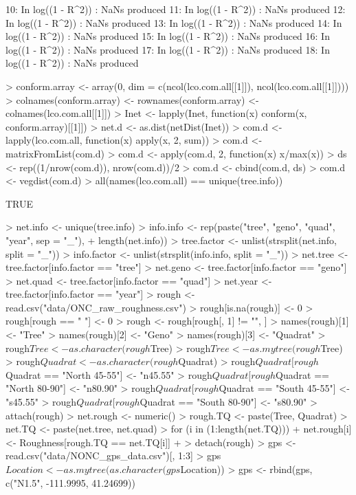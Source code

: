 \documentclass[12pt]{article}
\begin{document}
\begin{Schunk}
\begin{Soutput}
10: In log((1 - R^2)) : NaNs produced
11: In log((1 - R^2)) : NaNs produced
12: In log((1 - R^2)) : NaNs produced
13: In log((1 - R^2)) : NaNs produced
14: In log((1 - R^2)) : NaNs produced
15: In log((1 - R^2)) : NaNs produced
16: In log((1 - R^2)) : NaNs produced
17: In log((1 - R^2)) : NaNs produced
18: In log((1 - R^2)) : NaNs produced
\end{Soutput}
\begin{Sinput}
> conform.array <- array(0, dim = c(ncol(lco.com.all[[1]]), ncol(lco.com.all[[1]])))
> colnames(conform.array) <- rownames(conform.array) <- colnames(lco.com.all[[1]])
> Inet <- lapply(Inet, function(x) conform(x, conform.array)[[1]])
> net.d <- as.dist(netDist(Inet))
> com.d <- lapply(lco.com.all, function(x) apply(x, 2, sum))
> com.d <- matrixFromList(com.d)
> com.d <- apply(com.d, 2, function(x) x/max(x))
> ds <- rep((1/nrow(com.d)), nrow(com.d))/2
> com.d <- cbind(com.d, ds)
> com.d <- vegdist(com.d)
> all(names(lco.com.all) == unique(tree.info))
\end{Sinput}
\begin{Soutput}
[1] TRUE
\end{Soutput}
\begin{Sinput}
> net.info <- unique(tree.info)
> info.info <- rep(paste("tree", "geno", "quad", "year", sep = "_"), 
+     length(net.info))
> tree.factor <- unlist(strsplit(net.info, split = "_"))
> info.factor <- unlist(strsplit(info.info, split = "_"))
> net.tree <- tree.factor[info.factor == "tree"]
> net.geno <- tree.factor[info.factor == "geno"]
> net.quad <- tree.factor[info.factor == "quad"]
> net.year <- tree.factor[info.factor == "year"]
> rough <- read.csv("data/ONC_raw_roughness.csv")
> rough[is.na(rough)] <- 0
> rough[rough == " "] <- 0
> rough <- rough[rough[, 1] != "", ]
> names(rough)[1] <- "Tree"
> names(rough)[2] <- "Geno"
> names(rough)[3] <- "Quadrat"
> rough$Tree <- as.character(rough$Tree)
> rough$Tree <- as.mytree(rough$Tree)
> rough$Quadrat <- as.character(rough$Quadrat)
> rough$Quadrat[rough$Quadrat == "North 45-55"] <- "n45.55"
> rough$Quadrat[rough$Quadrat == "North 80-90"] <- "n80.90"
> rough$Quadrat[rough$Quadrat == "South 45-55"] <- "s45.55"
> rough$Quadrat[rough$Quadrat == "South 80-90"] <- "s80.90"
> attach(rough)
> net.rough <- numeric()
> rough.TQ <- paste(Tree, Quadrat)
> net.TQ <- paste(net.tree, net.quad)
> for (i in (1:length(net.TQ))) {
+     net.rough[i] <- Roughness[rough.TQ == net.TQ[i]]
+ }
> detach(rough)
> gps <- read.csv("data/NONC_gps_data.csv")[, 1:3]
> gps$Location <- as.mytree(as.character(gps$Location))
> gps <- rbind(gps, c("N1.5", -111.9995, 41.24699))

\end{Sinput}
\end{Schunk}
\end{document}
